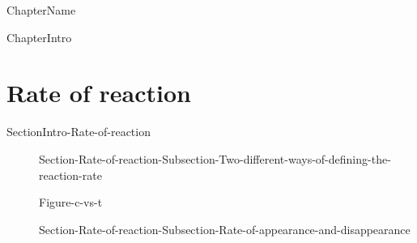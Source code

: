 \documentclass[main.tex]{subfiles}
\newcommand\chapterlabel{Ch-kinetics}\setcounter{figurenewcounter}{0}\setcounter{tablenewcounter}{0}\setcounter{formulanewcounter}{0}\chapterpicture{../{\chapterlabel}/figure1}\chapterpicturelabel{PxFuel}
\begin{document}
  
 
 \setcounter{chapter}{2}  {ChapterName}



%
  {ChapterIntro}







\section{Rate of reaction}{SectionIntro-Rate-of-reaction}
\sloppy\begin{description}
\item[] {Section-Rate-of-reaction-Subsection-Two-different-ways-of-defining-the-reaction-rate}



  {Figure-c-vs-t}
\item[] {Section-Rate-of-reaction-Subsection-Rate-of-appearance-and-disappearance}
\end{description}
\end{document}
